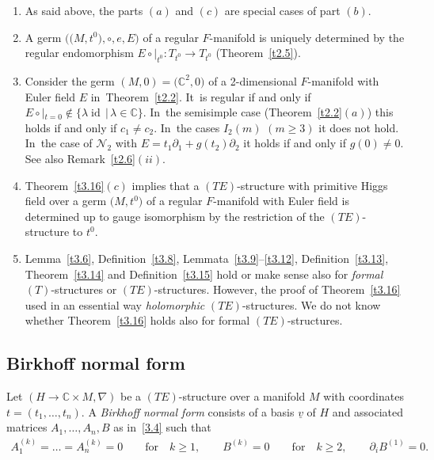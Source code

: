 \documentclass[10pt,a4paper]{amsart}
\numberwithin{equation}{section}
\numberwithin{figure}{section}
\newcommand{\C}{{\mathbb C}}
\newcommand{\NN}{{\mathcal N}}
\newcommand{\uuuu}{\underline}
\newcommand{\paa}{\partial}
\newcommand{\nnn}{\nabla}
\DeclareMathOperator{\id}{id}
\begin{document}
\begin{Remarks}\label{t3.17}\qquad
\begin{enumerate}\itemsep=0pt
\item[$(i)$] As said above, the parts $(a)$ and $(c)$ are special cases
of part $(b)$.

\item[$(ii)$] A germ $\big(\big(M,t^0\big),\circ,e,E\big)$ of a regular $F$-manifold
is uniquely determined by the regular endomorphism
$E\circ|_{t^0}\colon T_{t^0}\to T_{t^0}$ (Theorem~\ref{t2.5}).

\item[$(iii)$] Consider the germ $(M,0)=\big(\C^2,0\big)$ of a 2-dimensional
$F$-manifold with Euler field $E$ in~Theorem~\ref{t2.2}. It~is regular if and only if
$E\circ|_{t=0}\notin\{\lambda\id\,|\, \lambda\in\C\}$. In~the semisimple case (Theorem~\ref{t2.2}$(a)$) this
holds if and only if $c_1\neq c_2$. In~the cases $I_2(m)$ $(m\geq 3)$ it does not hold. In~the case of $\NN_2$ with $E=t_1\paa_1+g(t_2)\paa_2$
it holds if and only if $g(0)\neq 0$.
See also Remark~\ref{t2.6}$(ii)$.

\item[$(iv)$] Theorem~\ref{t3.16}$(c)$ implies that a $(TE)$-structure
with primitive Higgs field
over a germ $\big(M,t^0\big)$ of a regular $F$-manifold with
Euler field is determined up to gauge isomorphism
by the restriction of the $(TE)$-structure to $t^0$.

\item[$(v)$] Lemma~\ref{t3.6}, Definition~\ref{t3.8},
Lemmata~\ref{t3.9}--\ref{t3.12}, Definition~\ref{t3.13},
Theorem~\ref{t3.14} and Definition~\ref{t3.15}
hold or make sense also for {\it formal} $(T)$-structures
or $(TE)$-structures. However, the proof of Theorem~\ref{t3.16}
used in an essential way {\it holomorphic} $(TE)$-structures.
We do not know whether Theorem~\ref{t3.16}
holds also for formal $(TE)$-structures.
\end{enumerate}
\end{Remarks}





\subsection{Birkhoff normal form}%


\begin{Definition}\label{t3.18}
Let $(H\to\C\times M,\nnn)$ be a $(TE)$-structure
over a manifold $M$ with coordinates $t=(t_1,\dots ,t_n)$.
A {\it Birkhoff normal form} consists of a basis
$\uuuu{v}$ of $H$ and associated matrices
$A_1,\dots ,A_n,B$ as in~\eqref{3.4} such that
\begin{gather*}%
A_1^{(k)}=\dots =A_n^{(k)}=0\qquad \text{for}\quad k\geq 1,\qquad
B^{(k)}=0\qquad\text{for}\quad k\geq 2,\qquad
\paa_i B^{(1)}=0.
\end{gather*}
\end{Definition}
\end{document}
